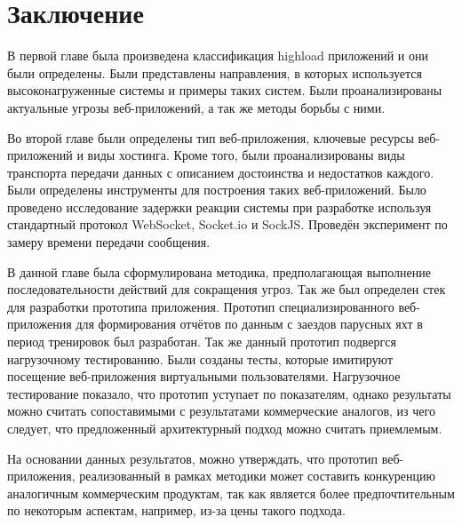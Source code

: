 \chapter*{Заключение} \label{ch-conclusion}

В первой главе была произведена классификация highload приложений и они были определены. Были представлены направления, в которых используется высоконагруженные системы и примеры таких систем. Были проанализированы актуальные угрозы веб-приложений, а так же методы борьбы с ними.

Во второй главе были определены тип веб-приложения, ключевые ресурсы веб-приложений и виды хостинга. Кроме того, были проанализированы виды транспорта передачи данных с описанием достоинства и недостатков каждого. Были определены инструменты для построения таких веб-приложений. Было проведено исследование задержки реакции системы при разработке используя стандартный протокол WebSocket, Socket.io и SockJS. Проведён эксперимент по замеру времени передачи сообщения. 

В данной главе была сформулирована методика, предполагающая выполнение последовательности действий для сокращения угроз. Так же был определен стек для разработки прототипа приложения. Прототип специализированного веб-приложения для формирования отчётов по данным с заездов парусных яхт в период тренировок был разработан. Так же данный прототип подвергся нагрузочному тестированию. Были созданы тесты, которые имитируют посещение веб-приложения виртуальными пользователями. Нагрузочное тестирование показало, что прототип уступает по показателям, однако результаты можно считать сопоставимыми с результатами коммерческие аналогов, из чего следует, что предложенный архитектурный подход можно считать приемлемым.

На основании данных результатов, можно утверждать, что прототип веб-приложения, реализованный в рамках методики может составить конкуренцию аналогичным коммерческим продуктам, так как  является более предпочтительным по некоторым аспектам, например, из-за цены такого подхода.

